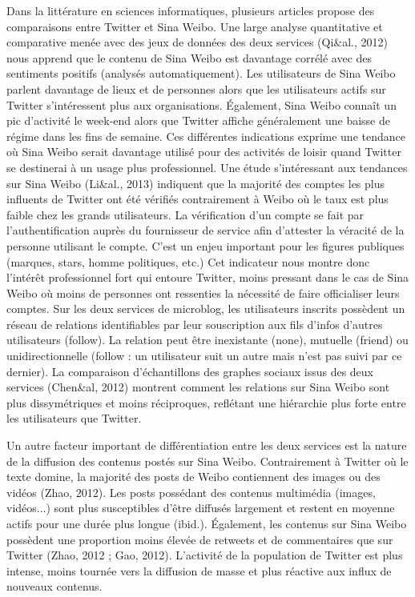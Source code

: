 \bigskip

{\color{black}
Dans la litt\'erature en sciences informatiques, plusieurs articles propose des comparaisons entre Twitter et Sina
Weibo. Une large analyse quantitative et comparative men\'ee avec des jeux de donn\'ees des deux services (Qi\&al.,
2012) nous apprend que le contenu de Sina Weibo est davantage corr\'el\'e avec des sentiments positifs (analys\'es
automatiquement). Les utilisateurs de Sina Weibo parlent davantage de lieux et de personnes alors que les utilisateurs
actifs sur Twitter s'int\'eressent plus aux organisations. \'Egalement, Sina Weibo conna\^it un pic d'activit\'e le
week-end alors que Twitter affiche g\'en\'eralement une baisse de r\'egime dans les fins de semaine. Ces diff\'erentes
indications exprime une tendance o\`u Sina Weibo serait davantage utilis\'e pour des activit\'es de loisir quand
Twitter se destinerai \`a un usage plus professionnel. Une \'etude s'int\'eressant aux tendances sur Sina Weibo
(Li\&al., 2013) indiquent que la majorit\'e des comptes les plus influents de Twitter ont \'et\'e v\'erifi\'es
contrairement \`a Weibo o\`u le taux est plus faible chez les grands utilisateurs. La v\'erification d'un compte se
fait par l'authentification aupr\`es du fournisseur de service afin d'attester la v\'eracit\'e de la personne utilisant
le compte. C'est un enjeu important pour les figures publiques (marques, stars, homme politiques, etc.) Cet indicateur
nous montre donc l'int\'er\^et professionnel fort qui entoure Twitter, moins pressant dans le cas de Sina Weibo o\`u
moins de personnes ont ressenties la n\'ecessit\'e de faire officialiser leurs comptes. Sur les deux services de
microblog, les utilisateurs inscrits poss\`edent un r\'eseau de relations identifiables par leur souscription aux fils
d'infos d'autres utilisateurs (follow). La relation peut \^etre inexistante (none), mutuelle (friend) ou
unidirectionnelle (follow : un utilisateur suit un autre mais n'est pas suivi par ce dernier). La comparaison
d'\'echantillons des graphes sociaux issus des deux services (Chen\&al, 2012) montrent comment les relations sur Sina
Weibo sont plus dissym\'etriques et moins r\'eciproques, refl\'etant une hi\'erarchie plus forte entre les utilisateurs
que Twitter. }


\bigskip

{\color{black}
Un autre facteur important de diff\'erentiation entre les deux services est la nature de la diffusion des contenus
post\'es sur Sina Weibo. Contrairement \`a Twitter o\`u le texte domine, la majorit\'e des posts de Weibo contiennent
des images ou des vid\'eos (Zhao, 2012). Les posts poss\'edant des contenus multim\'edia (images, vid\'eos...) sont
plus susceptibles d'\^etre diffus\'es largement et restent en moyenne actifs pour une dur\'ee plus longue (ibid.).
\'Egalement, les contenus sur Sina Weibo poss\`edent une proportion moins \'elev\'ee de retweets et de commentaires que
sur Twitter (Zhao, 2012 ; Gao, 2012). L'activit\'e de la population de Twitter est plus intense, moins tourn\'ee vers
la diffusion de masse et plus r\'eactive aux influx de nouveaux contenus. }


